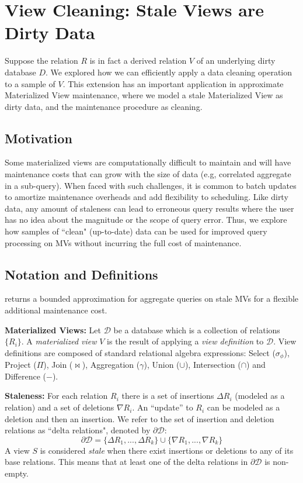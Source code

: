 \section{View Cleaning: Stale Views are Dirty Data \cite{krishnan2015svc}}
Suppose the relation $R$ is in fact a derived relation $V$ of an underlying dirty database $D$.
We explored how we can efficiently apply a data cleaning operation to a sample of $V$.
This extension has an important application in approximate Materialized View maintenance, where we model a stale Materialized View as dirty data, and the maintenance procedure as cleaning.  

\subsection{Motivation}
Some materialized views are computationally difficult to maintain and will have maintenance costs that can grow with the size of data (e.g, correlated aggregate in a sub-query).
When faced with such challenges, it is common to batch updates to amortize maintenance overheads and add flexibility to scheduling.
Like dirty data, any amount of staleness can lead to erroneous query results where the user has no idea about the magnitude or the scope of query error. 
Thus, we explore how samples of ``clean" (up-to-date) data can be used for improved query processing on MVs without incurring the full cost of maintenance.

\subsection{Notation and Definitions}\label{notation}
\svc returns a bounded approximation for aggregate queries on stale MVs for a flexible additional maintenance cost.

\noindent \textbf{Materialized Views:} Let $\mathcal{D}$ be a database which is a collection of relations $\{R_i\}$. 
A \emph{materialized view} $V$ is the result of applying a \emph{view definition} to $\mathcal{D}$. 
View definitions are composed of standard relational algebra expressions: Select ($\sigma_{\phi}$), Project ($\Pi$), Join ($\bowtie$), Aggregation ($\gamma$), Union ($\cup$), Intersection ($\cap$) and Difference ($-$). 

\vspace{0.5em}

\noindent \textbf{Staleness:} For each relation $R_i$ there is a set of insertions $\Delta R_i$ (modeled as a relation)
and a set of deletions $\nabla R_i$.
An ``update'' to $R_i$ can be modeled as a deletion and then an insertion.
We refer to the set of insertion and deletion relations as ``delta relations", denoted by $\partial \mathcal{D}$:
\[
	\partial \mathcal{D} = \{\Delta R_1,...,\Delta R_k\} \cup \{\nabla R_1,...,\nabla R_k\}
\]
A view $S$ is considered \emph{stale} when there exist insertions or deletions to any of its base relations.
This means that at least one of the delta relations in $\partial \mathcal{D}$ is non-empty.

